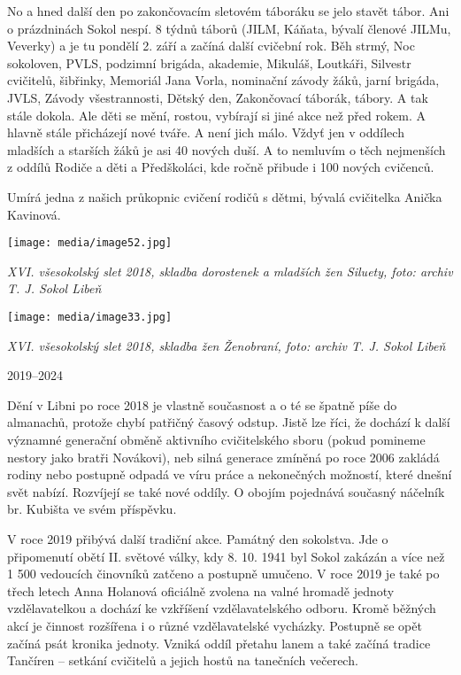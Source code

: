 No a hned další den po zakončovacím sletovém táboráku se jelo stavět
tábor. Ani o prázdninách Sokol nespí. 8 týdnů táborů (JILM, Káňata,
bývalí členové JILMu, Veverky) a je tu pondělí 2. září a začíná další
cvičební rok. Běh strmý, Noc sokoloven, PVLS, podzimní brigáda,
akademie, Mikuláš, Loutkáři, Silvestr cvičitelů, šibřinky, Memoriál Jana
Vorla, nominační závody žáků, jarní brigáda, JVLS, Závody všestrannosti,
Dětský den, Zakončovací táborák, tábory. A tak stále dokola. Ale děti se
mění, rostou, vybírají si jiné akce než před rokem. A hlavně stále
přicházejí nové tváře. A není jich málo. Vždyť jen v oddílech mladších a
starších žáků je asi 40 nových duší. A to nemluvím o těch nejmenších z
oddílů Rodiče a děti a Předškoláci, kde ročně přibude i 100 nových
cvičenců.

Umírá jedna z našich průkopnic cvičení rodičů s dětmi, bývalá cvičitelka
Anička Kavinová.

\texttt{[image: media/image52.jpg]}

\emph{XVI. všesokolský slet 2018, skladba dorostenek a mladších žen
Siluety, foto: archiv T. J. Sokol Libeň}

\texttt{[image: media/image33.jpg]}

\emph{XVI. všesokolský slet 2018, skladba žen Ženobraní, foto: archiv T.
J. Sokol Libeň}

2019--2024

Dění v Libni po roce 2018 je vlastně současnost a o té se špatně píše do
almanachů, protože chybí patřičný časový odstup. Jistě lze říci, že
dochází k další významné generační obměně aktivního cvičitelského sboru
(pokud pomineme nestory jako bratři Novákovi), neb silná generace
zmíněná po roce 2006 zakládá rodiny nebo postupně odpadá ve víru práce a
nekonečných možností, které dnešní svět nabízí. Rozvíjejí se také nové
oddíly. O obojím pojednává současný náčelník br. Kubišta ve svém
příspěvku.

V roce 2019 přibývá další tradiční akce. Památný den sokolstva. Jde o
připomenutí obětí II. světové války, kdy 8. 10. 1941 byl Sokol zakázán a
více než 1 500 vedoucích činovníků zatčeno a postupně umučeno. V roce
2019 je také po třech letech Anna Holanová oficiálně zvolena na valné
hromadě jednoty vzdělavatelkou a dochází ke vzkříšení vzdělavatelského
odboru. Kromě běžných akcí je činnost rozšířena i o různé vzdělavatelské
vycházky. Postupně se opět začíná psát kronika jednoty. Vzniká oddíl
přetahu lanem a také začíná tradice Tančíren -- setkání cvičitelů a
jejich hostů na tanečních večerech.

